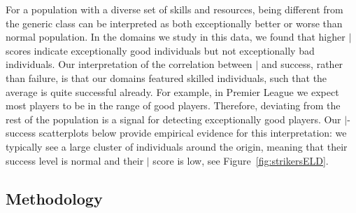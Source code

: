 {\begin{table}[htbp]
	
	\centering
		\caption{Success metrics and their distributions.\label{table:metrics}}	
	\end{table}



For a population with a diverse set of skills and resources,
being different from the generic class can be interpreted as both exceptionally better or worse than normal population. In the domains we study in this data, we found that higher $\mid$ scores indicate exceptionally good individuals but not exceptionally bad individuals. Our interpretation of the correlation between $\mid$ and success, rather than failure, is that our domains featured skilled individuals, such that the average is quite successful already. 
For example, in Premier League we expect most players to be in the range of good players. Therefore, deviating from the rest of the population is a signal for detecting exceptionally good players. Our $\mid$-success scatterplots below provide empirical evidence for this interpretation: we typically see a large cluster of individuals around the origin, meaning that their success level is normal and their $\mid$ score is low, see Figure~\ref{fig:strikersELD}. %

\subsection{Methodology}

}
